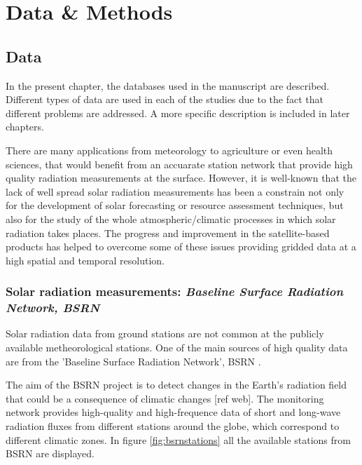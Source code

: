 \part{Data \& Methods\label{cha:datamethods}}

  
\chapter{Data\label{cha:Data}}

  In the present chapter, the databases used in the manuscript are described. Different types of data are used in each of the studies due to the fact that different problems are addressed. A more specific description is included in later chapters.

  There are many applications from meteorology to agriculture or even health sciences, that would benefit from an accuarate station network that provide high quality radiation measurements at the surface. However, it is well-known that the lack of  well spread solar radiation measurements has been a constrain not only for the development of solar forecasting or resource assessment techniques, but also for the study of the whole atmospheric/climatic processes in which solar radiation takes places. The progress and improvement in the satellite-based products has helped to overcome some of these issues providing gridded data at a high spatial and temporal resolution.

  \section{Solar radiation measurements: \textit{Baseline Surface Radiation Network, BSRN}}

  Solar radiation data from ground stations are not common at the publicly available metheorological stations. One of the main sources of high quality data are from the 'Baseline Surface Radiation Network', BSRN \cite*{Konig-Langlo2013}. %

  The aim of the BSRN project is to detect changes in the Earth's radiation field that could be a consequence of climatic changes [ref web]. The monitoring network provides high-quality and high-frequence data of short and long-wave radiation fluxes from different stations around the globe, which correspond to different climatic zones. In figure \ref{fig:bsrnstations} all the available stations from BSRN are displayed.

